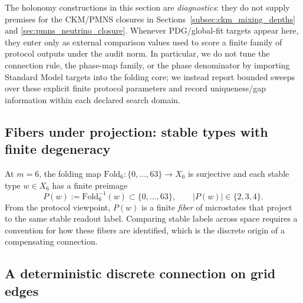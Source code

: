 \begin{remark}\label{rem:holonomy_diagnostic_status}
The holonomy constructions in this section are \emph{diagnostics}: they do not supply premises for the CKM/PMNS closures in Sections~\ref{subsec:ckm_mixing_depths} and \ref{sec:pmns_neutrino_closure}.
Whenever PDG/global-fit targets appear here, they enter only as external comparison values used to score a finite family of protocol outputs under the audit norm.
In particular, we do not tune the connection rule, the phase-map family, or the phase denominator by importing Standard Model targets into the folding core; we instead report bounded sweeps over these explicit finite protocol parameters and record uniqueness/gap information within each declared search domain.
\end{remark}

\subsection{Fibers under projection: stable types with finite degeneracy}
\label{subsec:fiber_under_projection}

At $m=6$, the folding map $\mathrm{Fold}_6:\{0,\dots,63\}\to X_6$ is surjective and each stable type $w\in X_6$ has a finite preimage
\[
P(w):=\mathrm{Fold}_6^{-1}(w)\subset\{0,\dots,63\},
\qquad |P(w)|\in\{2,3,4\}.
\]
From the protocol viewpoint, $P(w)$ is a finite \emph{fiber} of microstates that project to the same stable readout label.
Comparing stable labels across space requires a convention for how these fibers are identified, which is the discrete origin of a compensating connection.

\subsection{A deterministic discrete connection on grid edges}
\label{subsec:deterministic_edge_connection}

